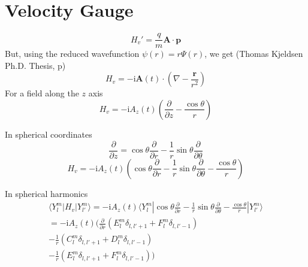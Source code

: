 \documentclass[a4paper,12pt]{article}
\newcommand{\matelem}[3]{\langle #1 | #2 | #3 \rangle}
\renewcommand{\imath}{{\mathrm i}}
\newcommand{\partialdiff}[2]{\frac{\partial #1}{\partial #2}}
\renewcommand{\vec}[1]{\ensuremath{\textbf{#1}}}
\begin{document}
\section{Velocity Gauge}

\begin{equation}
 	H_v' = \frac{q}{m} \vec{A} \cdot \vec{p}
\end{equation}
But, using the reduced wavefunction $\psi(r) = r \Psi(r)$, we get (Thomas
Kjeldsen Ph.D. Thesis, p)
\begin{equation}
 	H_v = -\imath \vec{A}(t) \cdot (\nabla - \frac{\vec{r}}{r^2})
\end{equation}
For a field along the $z$ axis
\begin{equation}
 	H_v = -\imath A_z(t) \left( \partialdiff{}{z} - \frac{\cos \theta}{r}
\right)
\end{equation}

In spherical coordinates 
\begin{equation}
 	\partialdiff{}{z} = 
		\cos \theta \partialdiff{}{r} 
		- \frac{1}{r} \sin \theta \partialdiff{}{\theta}
\end{equation}
\begin{equation}
 	H_v = -\imath A_z(t) \left( 
		\cos \theta \partialdiff{}{r} 
		- \frac{1}{r} \sin \theta \partialdiff{}{\theta} 
		- \frac{\cos \theta}{r}
		\right)
\end{equation}

In spherical harmonics
\begin{eqnarray}
 	\matelem{Y_l^m}{H_v}{Y_{l'}^m} = -\imath A_z(t)
 	\matelem
	{Y_l^m}
	{ 
	\cos \theta \partialdiff{}{r} 
	- \frac{1}{r} \sin \theta \partialdiff{}{\theta} 
	- \frac{\cos \theta}{r}
	}
	{Y_{l'}^m}
	\\ = 
	-\imath A_z(t)
	(
	\partialdiff{}{r} (E_l^m \delta_{l,l'+1} + F_l^m \delta_{l,l'-1}) \\
	- \frac{1}{r} (C_l^m \delta_{l,l'+1} + D_l^m \delta_{l,l'-1}) \\
	- \frac{1}{r} (E_l^m \delta_{l,l'+1} + F_l^m \delta_{l,l'-1})
	)
\end{eqnarray}
\end{document}
